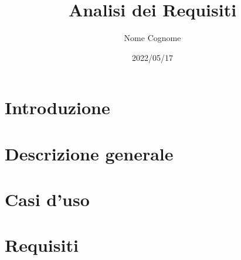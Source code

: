 \documentclass{classes/base}
\title{Analisi dei Requisiti}
\date{2022/05/17}
\author{Nome Cognome}
\begin{document}
	\maketitle
	\newpage
	
	\newpage
	\tableofcontents

	\newpage
	\section{Introduzione}
	

	\newpage
	\section{Descrizione generale}
	

	\newpage
	\section{Casi d'uso}
	

	\newpage
	\section{Requisiti}
	
\end{document}
